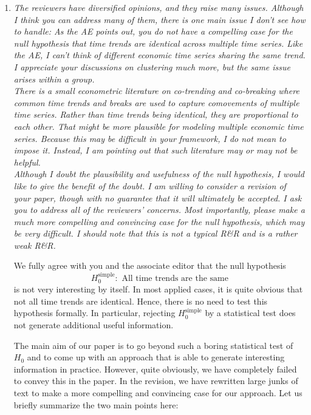\documentclass[a4paper,12pt]{article}
\begin{document}
\begin{enumerate}[label=\arabic*.,leftmargin=0.6cm]


\item \textit{The reviewers have diversified opinions, and they raise many issues. Although I think you can address many of them, there is one main issue I don’t see how to handle: As the AE points out, you do not have a compelling case for the null hypothesis that time trends are identical across multiple time series. Like the AE, I can’t think of different economic time series sharing the same trend.  I appreciate your discussions on clustering much more, but the same issue arises within a group. \\
There is a small econometric literature on co-trending and co-breaking where common time trends and breaks are used to capture comovements of multiple time series. Rather than time trends being identical, they are proportional to each other. That might be more plausible for modeling multiple economic time series. Because this may be difficult in your framework, I do not mean to impose it.  Instead, I am pointing out that such literature may or may not be helpful. \\
Although I doubt the plausibility and usefulness of the null hypothesis, I would like to give the benefit of the doubt. I am willing to consider a revision of your paper, though with no guarantee that it will ultimately be accepted. I ask you to address all of the reviewers' concerns. Most importantly, please make a much more compelling and convincing case for the null hypothesis, which may be very difficult. I should note that this is not a typical R\&R and is a rather weak R\&R.
}

We fully agree with you and the associate editor that the null hypothesis
\[ H_0^{\text{simple}}: \text{ All time trends are the same} \]
is not very interesting by itself. In most applied cases, it is quite obvious that not all time trends are identical. Hence, there is no need to test this hypothesis formally. In particular, rejecting $H_0^{\text{simple}}$ by a statistical test does not generate additional useful information. 

The main aim of our paper is to go beyond such a boring statistical test of $H_0$ and to come up with an approach that is able to generate interesting information in practice. However, quite obviously, we have completely failed to convey this in the paper. In the revision, we have rewritten large junks of text to make a more compelling and convincing case for our approach. Let us briefly summarize the two main points here: 
\begin{enumerate}[leftmargin=0.7cm]


\end{enumerate}
\end{enumerate}
\end{document}
